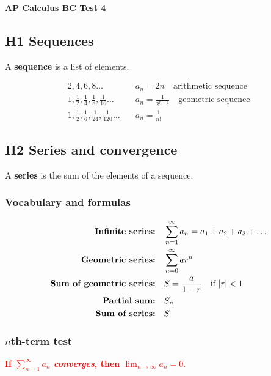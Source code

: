 \documentclass[letterpaper, 12pt]{article}
\begin{document}
\begin{center}
\textbf{{\Large AP Calculus BC Test 4}}
\end{center}

\subsection*{H1 Sequences}

A \textbf{sequence} is a list of elements.

\begin{align*}
2,4,6,8\dots \quad & a_n = 2n \quad \text{arithmetic sequence} \\
1, \frac12, \frac14, \frac18, \frac{1}{16}\dots \quad & a_n = \frac{1}{2^{n-1}} \quad \text{geometric sequence}\\
1, \frac12, \frac16, \frac{1}{24}, \frac{1}{120}\dots \quad & a_n = \frac{1}{n!}
\end{align*}

\subsection*{H2 Series and convergence}

A \textbf{series} is the sum of the elements of a sequence.

\subsubsection*{Vocabulary and formulas}

\begin{align*}
\text{\textbf{Infinite series:}} & \quad \sum_{n=1}^\infty a_n = a_1 + a_2 + a_3 + \dots \\ 
\text{\textbf{Geometric series:}} & \quad \sum_{n=0}^\infty ar^n \\
\text{\textbf{Sum of geometric series:}} & \quad S = \frac{a}{1-r} \quad \text{if } |r| < 1 \\
\text{\textbf{Partial sum:}} & \quad S_n \\
\text{\textbf{Sum of series:}} & \quad S \\
\end{align*}

\subsubsection*{$n$th-term test}

\textcolor{red}{\textbf{If $\displaystyle \sum_{n=1}^\infty a_n$ \textit{converges}, then $\displaystyle \lim_{n \to \infty} a_n = 0.$}}
\end{document}
